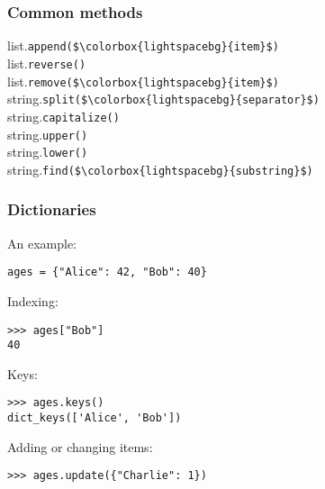 \documentclass[12pt,twocolumn]{article}
\begin{document}
	\subsubsection*{Common methods}
	
	list.\lstinline|append($\colorbox{lightspacebg}{item}$)| \\
	list.\lstinline|reverse()| \\
	list.\lstinline|remove($\colorbox{lightspacebg}{item}$)| \\
	
	string.\lstinline|split($\colorbox{lightspacebg}{separator}$)| \\
	string.\lstinline|capitalize()| \\
	string.\lstinline|upper()| \\
	string.\lstinline|lower()| \\
	string.\lstinline|find($\colorbox{lightspacebg}{substring}$)| \\
	
	\subsubsection*{Dictionaries}
	
	An example:
	\begin{lstlisting}
ages = {"Alice": 42, "Bob": 40}\end{lstlisting}
	Indexing:
	\begin{lstlisting}
>>> ages["Bob"]
40\end{lstlisting}
	Keys:
	\begin{lstlisting}
>>> ages.keys()
dict_keys(['Alice', 'Bob'])\end{lstlisting}
	Adding or changing items:
	\begin{lstlisting}
>>> ages.update({"Charlie": 1})\end{lstlisting}
\end{document}
